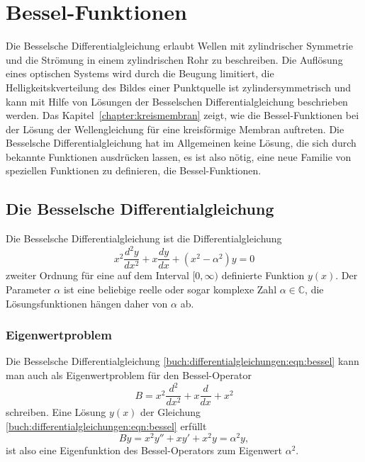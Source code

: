 %
%
%
\section{Bessel-Funktionen
\label{buch:differntialgleichungen:section:bessel}}
Die Besselsche Differentialgleichung
erlaubt Wellen mit zylindrischer
Symmetrie und die Strömung in einem zylindrischen Rohr zu beschreiben.
Die Auflösung eines optischen Systems wird durch die Beugung limitiert,
die Helligkeitskverteilung des Bildes einer Punktquelle ist
zylindersymmetrisch und kann mit Hilfe von Lösungen der Besselschen
Differentialgleichung beschrieben werden.
Das Kapitel~\ref{chapter:kreismembran} zeigt, wie die Bessel-Funktionen
bei der Lösung der Wellengleichung für eine kreisförmige Membran
auftreten.
Die Besselsche Differentialgleichung hat im Allgemeinen keine Lösung,
die sich durch bekannte Funktionen ausdrücken lassen, es ist also
nötig, eine neue Familie von speziellen Funktionen zu definieren,
die Bessel-Funktionen.

%
%
\subsection{Die Besselsche Differentialgleichung}
Die Besselsche Differentialgleichung ist die Differentialgleichung
\begin{equation}
x^2\frac{d^2y}{dx^2} + x\frac{dy}{dx} + (x^2-\alpha^2)y = 0
\label{buch:differentialgleichungen:eqn:bessel}
\end{equation}
%
%
zweiter Ordnung
für eine auf dem Interval $[0,\infty)$ definierte Funktion $y(x)$.
Der Parameter $\alpha$ ist eine beliebige reelle oder sogar komplexe
Zahl $\alpha\in \mathbb{C}$,
die Lösungsfunktionen hängen daher von $\alpha$ ab.

%
%
\subsubsection{Eigenwertproblem}
Die Besselsche Differentialgleichung
\eqref{buch:differentialgleichungen:eqn:bessel}
kann man auch als Eigenwertproblem für den Bessel-Operator
%
%
\begin{equation}
B = x^2\frac{d^2}{dx^2} + x\frac{d}{dx} + x^2
\label{buch:differentialgleichungen:bessel-operator}
\end{equation}
schreiben.
Eine Lösung $y(x)$ der Gleichung
\eqref{buch:differentialgleichungen:eqn:bessel}
erfüllt
\[
By
=
x^2y''+xy'+x^2y
=\alpha^2 y,
\]
ist also eine Eigenfunktion des Bessel-Operators zum Eigenwert
$\alpha^2$.

